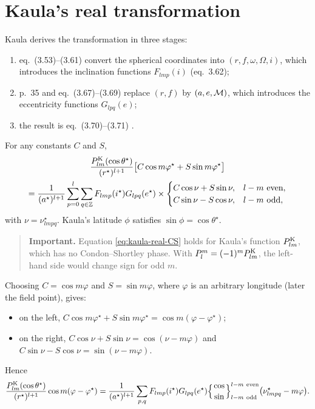 \section{Kaula's real transformation}
Kaula derives the transformation in three stages:
\begin{enumerate}
  \item eq.~(3.53)--(3.61) convert the spherical coordinates into $(r,f,\omega,\Omega,i)$, which introduces the inclination functions $F_{lmp}(i)$ (eq.~3.62);
  \item p.~35 and eq.~(3.67)--(3.69) replace $(r,f)$ by $(a,e,\mathcal{M})$, which introduces the eccentricity functions $G_{lpq}(e)$;
  \item the result is eq.~(3.70)--(3.71) \citep{Kaula2000,Kaula1964}.
\end{enumerate}
For any constants $C$ and $S$,
\begin{multline}
  \frac{P^{\mathrm K}_{lm}(\cos\theta^\star)}{(r^\star)^{l+1}}\big[C\cos m\varphi^\star+S\sin m\varphi^\star\big]\\
  =\frac{1}{(a^\star)^{l+1}}\sum_{p=0}^{l}\sum_{q\in\mathbb Z}F_{lmp}(i^\star)G_{lpq}(e^\star)\times
  \begin{cases}C\cos\nu+S\sin\nu,& l-m\ \text{even},\\ C\sin\nu-S\cos\nu,& l-m\ \text{odd},\end{cases} \label{eq:kaula-real-CS}
\end{multline}
with $\nu=\nu^\star_{lmpq}$. Kaula's latitude $\phi$ satisfies $\sin\phi=\cos\theta^\star$.

\begin{quote}\small
\textbf{Important.} Equation \eqref{eq:kaula-real-CS} holds for Kaula's function $P^{\mathrm K}_{lm}$, which has no Condon--Shortley phase. With $P_l^m=(-1)^mP^{\mathrm K}_{lm}$, the left-hand side would change sign for odd $m$.
\end{quote}

Choosing $C=\cos m\varphi$ and $S=\sin m\varphi$, where $\varphi$ is an arbitrary longitude (later the field point), gives:
\begin{itemize}
  \item on the left, $C\cos m\varphi^\star+S\sin m\varphi^\star=\cos m(\varphi-\varphi^\star)$;
  \item on the right, $C\cos\nu+S\sin\nu=\cos(\nu-m\varphi)$ and $C\sin\nu-S\cos\nu=\sin(\nu-m\varphi)$.
\end{itemize}
Hence
\begin{equation}
  \frac{\PK_{lm}(\cos\theta^\star)}{(r^\star)^{l+1}}\cos m(\varphi-\varphi^\star)=\frac{1}{(a^\star)^{l+1}}\sum_{p,q}F_{lmp}(i^\star)G_{lpq}(e^\star)\Big\{{\cos\atop\sin}\Big\}^{l-m\ \text{even}}_{l-m\ \text{odd}}\big(\nu^\star_{lmpq}-m\varphi\big). \label{eq:kaula-real}
\end{equation}

